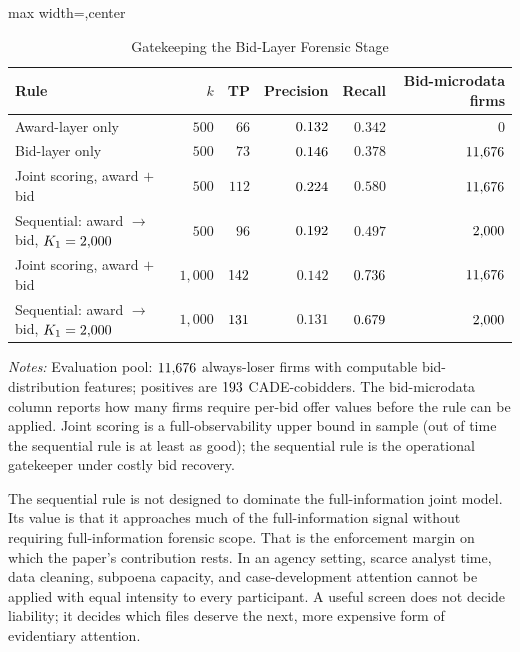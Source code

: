 \begin{table}[htbp]
\centering
\caption{Gatekeeping the Bid-Layer Forensic Stage}
\label{tab:gatekeeper_submission}
\footnotesize
\begin{adjustbox}{max width=\textwidth,center}
\begin{threeparttable}
\begin{tabular}{p{5.2cm}rrrrr}
\toprule
Rule & $k$ & TP & Precision & Recall & Bid-microdata firms \\
\midrule
Award-layer only & $500$ & $66$ & $0.132$ & $0.342$ & $0$ \\
Bid-layer only & $500$ & $73$ & $0.146$ & $0.378$ & $11{,}676$ \\
Joint scoring, award $+$ bid & $500$ & $112$ & $0.224$ & $0.580$ & $11{,}676$ \\
Sequential: award $\rightarrow$ bid, $K_1=2{,}000$
& $500$ & $96$ & $0.192$ & $0.497$ & $2{,}000$ \\
\midrule
Joint scoring, award $+$ bid & $1{,}000$ & $142$
& $0.142$ & $0.736$ & $11{,}676$ \\
Sequential: award $\rightarrow$ bid, $K_1=2{,}000$
& $1{,}000$ & $131$
& $0.131$ & $0.679$ & $2{,}000$ \\
\bottomrule
\end{tabular}
\begin{tablenotes}
\footnotesize
\item \textit{Notes:} Evaluation pool:
$11{,}676$ always-loser firms with computable
bid-distribution features; positives are $193$
CADE-cobidders. The bid-microdata column reports how many firms
require per-bid offer values before the rule can be applied.
Joint scoring is a full-observability upper bound in sample (out
of time the sequential rule is at least as good); the sequential
rule is the operational gatekeeper under costly bid recovery.
\end{tablenotes}
\end{threeparttable}
\end{adjustbox}
\end{table}

The sequential rule is not designed to dominate the full-information
joint model. Its value is that it approaches much of the
full-information signal without requiring full-information
forensic scope. That is the enforcement margin on which the
paper's contribution rests. In an agency setting, scarce analyst
time, data cleaning, subpoena capacity, and case-development
attention cannot be applied with equal intensity to every
participant. A useful screen does not decide liability; it
decides which files deserve the next, more expensive form of
evidentiary attention.

